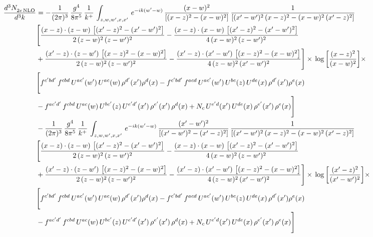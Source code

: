 \documentclass[9pt]{article}
\numberwithin{equation}{section}
\begin{document}
\begin{align}
 \frac{d^{3}N_{2e\,\rm NLO}^{\rm}}{d^{3}k}  & =   -\frac{1}{(2\pi)^{3}}\, \frac{g^{4}}{8\pi^{5}}\,\frac{1}{k^{+}}\,\int_{z,w,w^{\prime},x,x'}\, e^{-ik(w^{\prime}-w)}\,\frac{(x-w)^{2}}{\left[(x-z)^{2}-(x-w)^{2}\right]}\, \frac{1}{\left[(x'-w')^{2}\, (x-z)^{2} - (x-w)^{2}\, (x'-z)^{2}\right]} \notag \\ & \Bigg[\frac{(x-z)\cdot (z-w)\, \left[(x'-z)^{2}-(x'-w')^{2}\right]}{2\, (z-w)^{2}\, (z-w')^{2}}  - \frac{(x-z)\cdot (x-w)\,\left[(x'-z)^{2}-(x'-w')^{2}\right] }{4\,(x-w)^{2}\,(z-w')^{2}}\notag \\ & +\frac{(x'-z)\cdot (z-w')\, \left[(x-z)^{2}-(x-w)^{2}\right]}{2\, (z-w)^{2}\, (z-w')^{2}}-\frac{(x'-z)\cdot (x'-w')\, \left[(x-z)^{2}-(x-w)^{2}\right]}{4\, (z-w)^{2}\,(x'-w')^{2}}\Bigg]\times\, \log{\left[\frac{(x-z)^{2}}{(x-w)^{2}}\right]}\times\,\notag \\ & \Bigg[f^{c'bd'}\,f^{cbd}\, U^{ac'}(w')\,U^{ac}(w)\,\rho^{d'}(x')\rho^{d}(x)- f^{c'bd'}\,f^{acd}\,U^{ac'}(w')\,U^{bc}(z)\,U^{de}(x)\,\rho^{d'}(x')\rho^{e}(x) \notag \\ & -f^{ac'd'}\,f^{cbd}\,U^{ac}(w)\,U^{bc'}(z)\,U^{e'd'}(x')\,\rho^{e'}(x')\,\rho^{d}(x) +N_{c}\,U^{e'd}(x')\,U^{de}(x)\,\rho^{e'}(x')\,\rho^{e}(x)\Bigg] \notag \\
& -\frac{1}{(2\pi)^{3}}\, \frac{g^{4}}{8\pi^{5}}\,\frac{1}{k^{+}}\,\int_{z,w,w^{\prime},x,x'}\, e^{-ik(w^{\prime}-w)}\, \frac{(x'-w')^{2}}{\left[(x'-w')^{2}-(x'-z)^{2}\right]}\, \frac{1}{\left[(x'-w')^{2}\, (x-z)^{2} - (x-w)^{2}\, (x'-z)^{2}\right]}  \notag \\ & \Bigg[\frac{(x-z)\cdot (z-w)\, \left[(x'-z)^{2}-(x'-w')^{2}\right]}{2\, (z-w)^{2}\, (z-w')^{2}}  - \frac{(x-z)\cdot (x-w)\,\left[(x'-z)^{2}-(x'-w')^{2}\right] }{4\,(x-w)^{2}\,(z-w')^{2}}\notag \\ & +\frac{(x'-z)\cdot (z-w')\, \left[(x-z)^{2}-(x-w)^{2}\right]}{2\, (z-w)^{2}\, (z-w')^{2}}-\frac{(x'-z)\cdot (x'-w')\, \left[(x-z)^{2}-(x-w)^{2}\right]}{4\, (z-w)^{2}\,(x'-w')^{2}}\Bigg]\times\,\log{\left[\frac{(x'-z)^{2}}{(x'-w')^{2}}\right]}\times\notag \\ & \Bigg[f^{c'bd'}\,f^{cbd}\, U^{ac'}(w')\,U^{ac}(w)\,\rho^{d'}(x')\rho^{d}(x)- f^{c'bd'}\,f^{acd}\,U^{ac'}(w')\,U^{bc}(z)\,U^{de}(x)\,\rho^{d'}(x')\rho^{e}(x) \notag \\ & -f^{ac'd'}\,f^{cbd}\,U^{ac}(w)\,U^{bc'}(z)\,U^{e'd'}(x')\,\rho^{e'}(x')\,\rho^{d}(x) +N_{c}\,U^{e'd}(x')\,U^{de}(x)\,\rho^{e'}(x')\,\rho^{e}(x)\Bigg]
\end{align}
\end{document}
